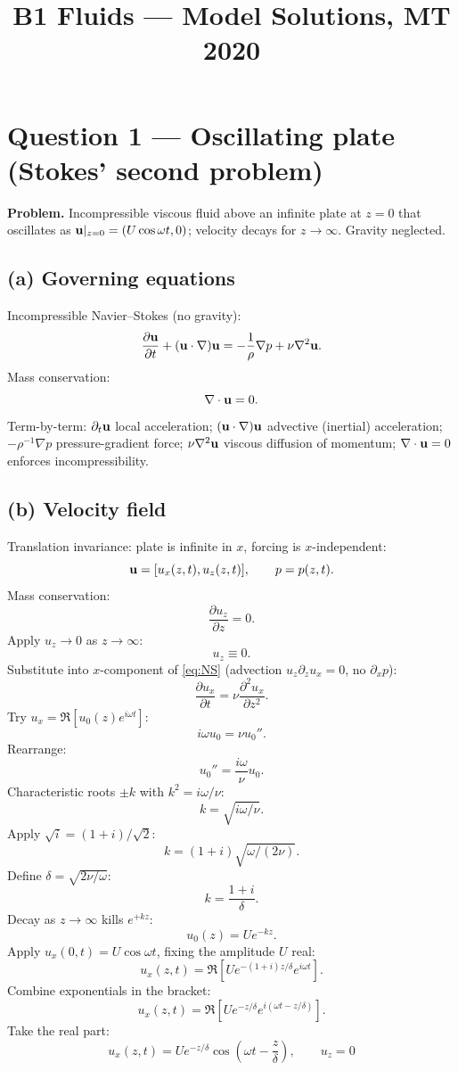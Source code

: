 \documentclass[11pt]{article}
\title{B1 Fluids --- Model Solutions, MT 2020}
\author{}
\date{}
\newcommand{\pd}[2]{\frac{\partial #1}{\partial #2}}
\newcommand{\pdd}[2]{\frac{\partial^{2} #1}{\partial #2^{2}}}
\newcommand{\Lap}{\nabla^{2}}
\begin{document}
\maketitle

\section*{Question 1 --- Oscillating plate (Stokes' second problem)}

\textbf{Problem.} Incompressible viscous fluid above an infinite plate at $z=0$ that oscillates as $\vb u|_{z=0}=(U\cos\omega t,0)$; velocity decays for $z\to\infty$. Gravity neglected.

\subsection*{(a) Governing equations}

Incompressible Navier--Stokes (no gravity):
\begin{equation}
\pd{\vb u}{t}+(\vb u\cdot\nabla)\vb u=-\frac{1}{\rho}\nabla p+\nu\Lap\vb u.
\label{eq:NS}
\end{equation}
Mass conservation:
\[
\nabla\cdot\vb u=0.
\]
Term-by-term: $\partial_t\vb u$ local acceleration; $(\vb u\cdot\nabla)\vb u$ advective (inertial) acceleration; $-\rho^{-1}\nabla p$ pressure-gradient force; $\nu\Lap\vb u$ viscous diffusion of momentum; $\nabla\cdot\vb u=0$ enforces incompressibility.

\subsection*{(b) Velocity field}

Translation invariance: plate is infinite in $x$, forcing is $x$-independent:
\[
\vb u=[u_x(z,t),u_z(z,t)],\qquad p=p(z,t).
\]
Mass conservation:
\[
\pd{u_z}{z}=0.
\]
Apply $u_z\to 0$ as $z\to\infty$:
\[
u_z\equiv 0.
\]
Substitute into $x$-component of \eqref{eq:NS} (advection $u_z\partial_z u_x=0$, no $\partial_x p$):
\begin{equation}
\pd{u_x}{t}=\nu\pdd{u_x}{z}.
\label{eq:diffux}
\end{equation}
Try $u_x=\Re[u_0(z)e^{i\omega t}]$:
\[
i\omega u_0=\nu u_0''.
\]
Rearrange:
\[
u_0''=\frac{i\omega}{\nu}u_0.
\]
Characteristic roots $\pm k$ with $k^2=i\omega/\nu$:
\[
k=\sqrt{i\omega/\nu}.
\]
Apply $\sqrt{i}=(1+i)/\sqrt{2}$:
\[
k=(1+i)\sqrt{\omega/(2\nu)}.
\]
Define $\delta=\sqrt{2\nu/\omega}$:
\[
k=\frac{1+i}{\delta}.
\]
Decay as $z\to\infty$ kills $e^{+kz}$:
\[
u_0(z)=U e^{-kz}.
\]
Apply $u_x(0,t)=U\cos\omega t$, fixing the amplitude $U$ real:
\[
u_x(z,t)=\Re\!\left[U e^{-(1+i)z/\delta}e^{i\omega t}\right].
\]
Combine exponentials in the bracket:
\[
u_x(z,t)=\Re\!\left[U e^{-z/\delta}e^{i(\omega t-z/\delta)}\right].
\]
Take the real part:
\begin{equation}
\boxed{\;u_x(z,t)=U e^{-z/\delta}\cos\!\left(\omega t-\frac{z}{\delta}\right),\qquad u_z=0\;}
\label{eq:ux}
\end{equation}
\end{document}
